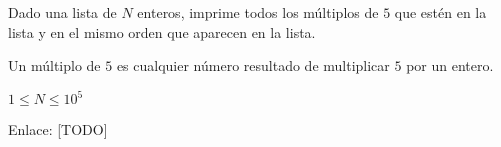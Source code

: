  Dado una lista de \(N\) enteros, imprime todos los múltiplos de \(5\) que estén en la lista y en el mismo orden que aparecen en la lista. 

Un múltiplo de \(5\) es cualquier número resultado de multiplicar \(5\) por un entero.

\begin{plimits}
	\item \(1\leq N \leq 10^5\)
\end{plimits}

Enlace: [TODO]